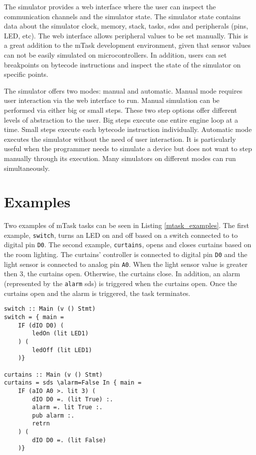 The simulator provides a web interface where the user can inspect the communication channels and the simulator state. The simulator state contains data about the simulator clock, memory, stack, tasks, \acp{sds} and peripherals (pins, LED, etc). The web interface allows peripheral values to be set manually. This is a great addition to the mTask development environment, given that sensor values can not be easily simulated on microcontrollers. In addition, users can set breakpoints on bytecode instructions and inspect the state of the simulator on specific points.

The simulator offers two modes: manual and automatic. Manual mode requires user interaction via the web interface to run. Manual simulation can be performed via either big or small steps. These two step options offer different levels of abstraction to the user. Big steps execute one entire engine loop at a time. Small steps execute each bytecode instruction individually. Automatic mode executes the simulator without the need of user interaction. It is particularly useful when the programmer needs to simulate a device but does not want to step manually through its execution. Many simulators on different modes can run simultaneously.

\section{Examples}

Two examples of mTask tasks can be seen in Listing \ref{mtask_examples}. The first example, \texttt{switch}, turns an LED on and off based on a switch connected to to digital pin \texttt{D0}. The second example, \texttt{curtains}, opens and closes curtains based on the room lighting. The curtains' controller is connected to digital pin \texttt{D0} and the light sensor is connected to analog pin \texttt{A0}. When the light sensor value is greater then 3, the curtains open. Otherwise, the curtains close. In addition, an alarm (represented by the \texttt{alarm} \ac{sds}) is triggered when the curtains open. Once the curtains open and the alarm is triggered, the task terminates.

\begin{lstlisting}[caption=Examples of mTask tasks,captionpos=b,label=mtask_examples]
switch :: Main (v () Stmt) 
switch = { main = 
	IF (dIO D0) (
		ledOn (lit LED1)
	) (
		ledOff (lit LED1)
	)}
	
curtains :: Main (v () Stmt)
curtains = sds \alarm=False In { main = 
	IF (aIO A0 >. lit 3) (
		dIO D0 =. (lit True) :.
		alarm =. lit True :.
		pub alarm :.
		retrn
	) (
		dIO D0 =. (lit False)
	)}
\end{lstlisting}

